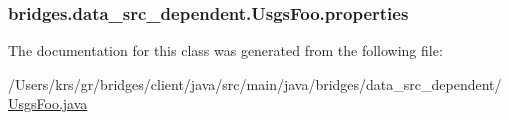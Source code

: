 \subsubsection[{properties}]{ bridges.\+data\+\_\+src\+\_\+dependent.\+Usgs\+Foo.\+properties}\label{classbridges_1_1data__src__dependent_1_1_usgs_foo_a030d83e136f146824b5bda34a4c6fd1c}


The documentation for this class was generated from the following file\+:\begin{DoxyCompactItemize}
\item 
/\+Users/krs/gr/bridges/client/java/src/main/java/bridges/data\+\_\+src\+\_\+dependent/\hyperlink{_usgs_foo_8java}{Usgs\+Foo.\+java}\end{DoxyCompactItemize}
